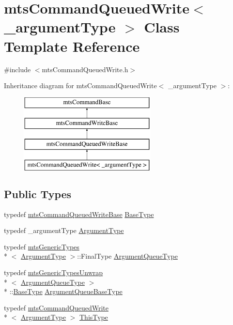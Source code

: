 \hypertarget{classmts_command_queued_write}{\section{mts\-Command\-Queued\-Write$<$ \-\_\-argument\-Type $>$ Class Template Reference}
\label{classmts_command_queued_write}
}


{\ttfamily \#include $<$mts\-Command\-Queued\-Write.\-h$>$}

Inheritance diagram for mts\-Command\-Queued\-Write$<$ \-\_\-argument\-Type $>$\-:\begin{figure}[H]
\begin{center}
\leavevmode
\includegraphics[height=4.000000cm]{d9/d85/classmts_command_queued_write}
\end{center}
\end{figure}
\subsection*{Public Types}
\begin{DoxyCompactItemize}
\item 
typedef \hyperlink{classmts_command_queued_write_base}{mts\-Command\-Queued\-Write\-Base} \hyperlink{classmts_command_queued_write_a45b3d0b46248285d3535ad64ee93a28d}{Base\-Type}
\item 
typedef \-\_\-argument\-Type \hyperlink{classmts_command_queued_write_a2f29807aedb1cbd9293f3f5bfbace404}{Argument\-Type}
\item 
typedef \hyperlink{classmts_generic_types}{mts\-Generic\-Types}\\*
$<$ \hyperlink{classmts_command_queued_write_a2f29807aedb1cbd9293f3f5bfbace404}{Argument\-Type} $>$\-::Final\-Type \hyperlink{classmts_command_queued_write_a782b598b821585636a6a4f2039368b49}{Argument\-Queue\-Type}
\item 
typedef \hyperlink{classmts_generic_types_unwrap}{mts\-Generic\-Types\-Unwrap}\\*
$<$ \hyperlink{classmts_command_queued_write_a782b598b821585636a6a4f2039368b49}{Argument\-Queue\-Type} $>$\\*
\-::\hyperlink{classmts_command_queued_write_a45b3d0b46248285d3535ad64ee93a28d}{Base\-Type} \hyperlink{classmts_command_queued_write_a4fe3711262b382c4e23857c2e4f35979}{Argument\-Queue\-Base\-Type}
\item 
typedef \hyperlink{classmts_command_queued_write}{mts\-Command\-Queued\-Write}\\*
$<$ \hyperlink{classmts_command_queued_write_a2f29807aedb1cbd9293f3f5bfbace404}{Argument\-Type} $>$ \hyperlink{classmts_command_queued_write_aff1e774ee1a65b26df3a2924f8a9bff6}{This\-Type}
\end{DoxyCompactItemize}
